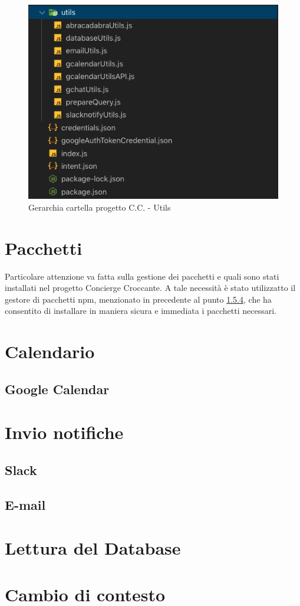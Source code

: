 \begin{figure}[H]
	\includegraphics[width=13cm]{immagini/skill-folder3.png}
	\caption{\label{fig:aws_lambda_regione}Gerarchia cartella progetto C.C. - Utils}
\end{figure}

\section{Pacchetti}
Particolare attenzione va fatta sulla gestione dei pacchetti e quali sono stati installati nel progetto Concierge Croccante. A tale necessità è stato utilizzatto il gestore di pacchetti npm, menzionato in precedente al punto \hyperref[npm]{1.5.4}, che ha consentito di installare in maniera sicura e immediata i pacchetti necessari. 

\section{Calendario}
\subsection{Google Calendar}

\section{Invio notifiche}
\subsection{Slack}
\subsection{E-mail}

\section{Lettura del Database}

\section{Cambio di contesto}
